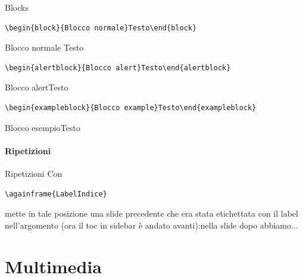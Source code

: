 \documentclass[aspectratio=169, compress]{beamer}
\begin{document}
\begin{frame}[label=NomeSlide, fragile, shrink=30]{Blocks}
\begin{verbatim}
\begin{block}{Blocco normale}Testo\end{block}
\end{verbatim}
\begin{block}{Blocco normale}
    Testo
\end{block}
\begin{verbatim}
\begin{alertblock}{Blocco alert}Testo\end{alertblock}
\end{verbatim}
\begin{alertblock}{Blocco alert}Testo\end{alertblock}
\begin{verbatim}
\begin{exampleblock}{Blocco example}Testo\end{exampleblock}
\end{verbatim}
\begin{exampleblock}{Blocco esempio}Testo\end{exampleblock}
\end{frame}
\subsection{Ripetizioni}
\begin{frame}[fragile]{Ripetizioni}
Con
\begin{verbatim}\againframe{LabelIndice}\end{verbatim}
mette in tale posizione una slide precedente che era stata etichettata con il label nell'argomento (ora il toc in sidebar è andato avanti):\pause nella slide dopo abbiamo...
\end{frame}
\part{Multimedia}
\end{document}
